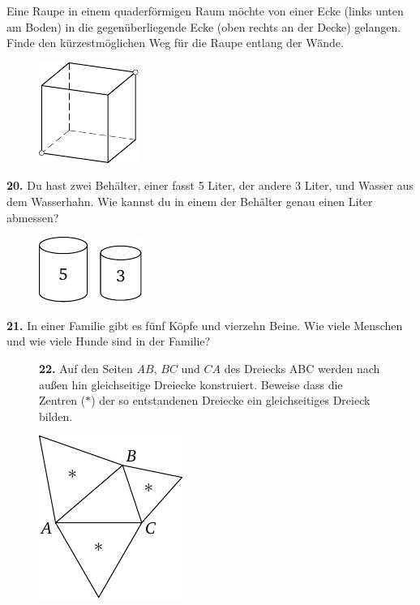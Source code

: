 \documentclass[12pt]{article} %
\begin{document}
 Eine Raupe in einem quaderförmigen Raum möchte von einer Ecke (links unten am Boden) in die gegenüberliegende Ecke (oben rechts an der Decke) gelangen. 
Finde den kürzestmöglichen Weg für die Raupe entlang der Wände. 
\begin{figure}[h]
\centering
\footnotesize
\includegraphics[scale=1]{taskbook-3}
\end{figure}
\newline\newline\quad
{\bf 20.} Du hast zwei Behälter, einer fasst 5 Liter, der andere 3 Liter, und Wasser aus dem Wasserhahn. Wie kannst du in einem der Behälter genau einen Liter abmessen? 
\begin{figure}[h!]
\centering
\footnotesize
\includegraphics[scale=1]{taskbook-4}
\end{figure}

\medskip\noindent
{\bf 21.} In einer Familie gibt es fünf Köpfe und vierzehn Beine. Wie viele Menschen und wie viele Hunde sind in der Familie?
\begin{figure}[h!]
\begin{minipage}[c][][c]{0.7 \textwidth}
{\bf 22.} Auf den Seiten $AB$, $BC$ und $CA$ des Dreiecks ABC werden nach außen hin gleichseitige Dreiecke konstruiert. Beweise dass die Zentren ($*$) der so entstandenen Dreiecke ein gleichseitiges Dreieck bilden.\end{minipage}
\hfill
\begin{minipage}[c]{0.2 \textwidth}
\includegraphics[scale=1]{taskbook-6}
\end{minipage}
\end{figure}
\end{document}
